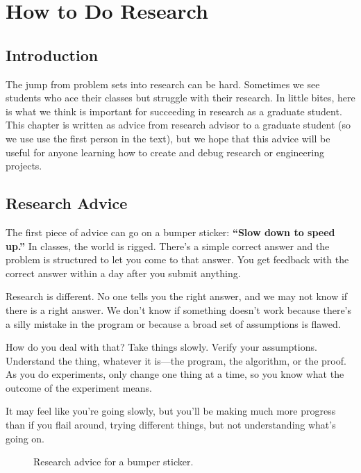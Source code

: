 
\chapter{How to Do Research}
\label{chapter:how_to_do_research}

\section{Introduction}

The jump from problem sets into research
can be hard.  Sometimes we see students who ace their
classes but struggle with their research.  In little bites, here is what we think is important for succeeding in research as a graduate student.  This chapter is written as advice from research advisor to a graduate student (so we use use the first person in the text), but we hope that this advice will be useful for anyone learning how to create and debug research or engineering projects.

\section{Research Advice}

The first piece of advice can go on a bumper sticker: {\bf ``Slow down to speed up.''}   In
classes, the world is rigged.  There's a simple correct answer and the problem is structured to let you come to that answer.  You get  feedback with the correct answer within a day after you submit  anything.

Research is different.  No one tells you the right answer, and we may not know if there is a right answer.  We don't know if something doesn't work because there's a  silly mistake in the program or because a broad set of assumptions is flawed.

How do you deal with that?  Take things slowly.  Verify your
assumptions.  Understand the thing, whatever it is---the program, the algorithm,  or the
proof.  As you do experiments, only change one thing at a time, so you know what the outcome of the experiment means.

It may feel like you're going slowly, but you'll be making much more progress than if you flail around, trying different things, but not understanding what's going on. \\

\begin{figure}[htpb!]
  \centerline{}
  \caption{Research advice for a bumper sticker.}
  \label{fig:vw}
\end{figure}


